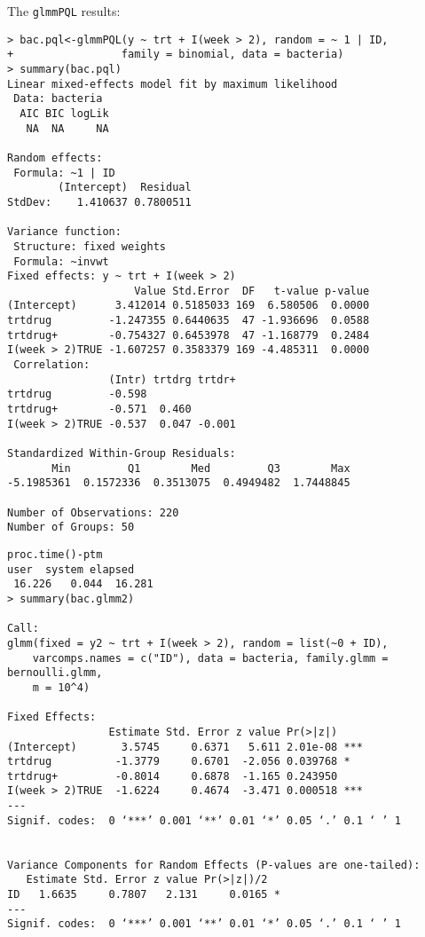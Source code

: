 \documentclass{article}
\begin{document}
The \texttt{glmmPQL} results:
\begin{verbatim}
> bac.pql<-glmmPQL(y ~ trt + I(week > 2), random = ~ 1 | ID,
+                 family = binomial, data = bacteria)
> summary(bac.pql)
Linear mixed-effects model fit by maximum likelihood
 Data: bacteria 
  AIC BIC logLik
   NA  NA     NA

Random effects:
 Formula: ~1 | ID
        (Intercept)  Residual
StdDev:    1.410637 0.7800511

Variance function:
 Structure: fixed weights
 Formula: ~invwt 
Fixed effects: y ~ trt + I(week > 2) 
                    Value Std.Error  DF   t-value p-value
(Intercept)      3.412014 0.5185033 169  6.580506  0.0000
trtdrug         -1.247355 0.6440635  47 -1.936696  0.0588
trtdrug+        -0.754327 0.6453978  47 -1.168779  0.2484
I(week > 2)TRUE -1.607257 0.3583379 169 -4.485311  0.0000
 Correlation: 
                (Intr) trtdrg trtdr+
trtdrug         -0.598              
trtdrug+        -0.571  0.460       
I(week > 2)TRUE -0.537  0.047 -0.001

Standardized Within-Group Residuals:
       Min         Q1        Med         Q3        Max 
-5.1985361  0.1572336  0.3513075  0.4949482  1.7448845 

Number of Observations: 220
Number of Groups: 50 
\end{verbatim}

\begin{verbatim}
proc.time()-ptm
user  system elapsed 
 16.226   0.044  16.281 
> summary(bac.glmm2)

Call:
glmm(fixed = y2 ~ trt + I(week > 2), random = list(~0 + ID), 
    varcomps.names = c("ID"), data = bacteria, family.glmm = bernoulli.glmm, 
    m = 10^4)

Fixed Effects:
                Estimate Std. Error z value Pr(>|z|)    
(Intercept)       3.5745     0.6371   5.611 2.01e-08 ***
trtdrug          -1.3779     0.6701  -2.056 0.039768 *  
trtdrug+         -0.8014     0.6878  -1.165 0.243950    
I(week > 2)TRUE  -1.6224     0.4674  -3.471 0.000518 ***
---
Signif. codes:  0 ‘***’ 0.001 ‘**’ 0.01 ‘*’ 0.05 ‘.’ 0.1 ‘ ’ 1


Variance Components for Random Effects (P-values are one-tailed):
   Estimate Std. Error z value Pr(>|z|)/2  
ID   1.6635     0.7807   2.131     0.0165 *
---
Signif. codes:  0 ‘***’ 0.001 ‘**’ 0.01 ‘*’ 0.05 ‘.’ 0.1 ‘ ’ 1


\end{verbatim}
\end{document}
